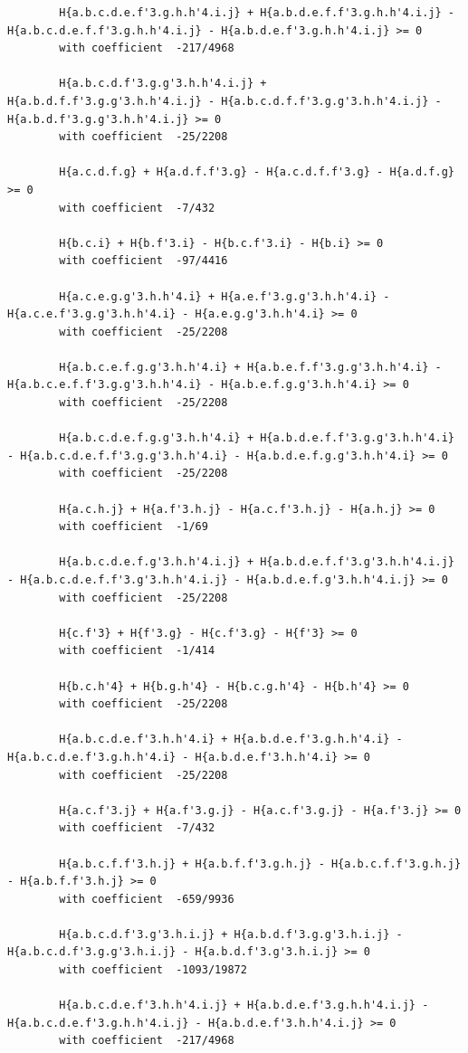 \documentclass[11pt, a4paper]{kybernetika}
\begin{document}
\begin{verbatim}
		H{a.b.c.d.e.f'3.g.h.h'4.i.j} + H{a.b.d.e.f.f'3.g.h.h'4.i.j} - H{a.b.c.d.e.f.f'3.g.h.h'4.i.j} - H{a.b.d.e.f'3.g.h.h'4.i.j} >= 0
		with coefficient  -217/4968
		
		H{a.b.c.d.f'3.g.g'3.h.h'4.i.j} + H{a.b.d.f.f'3.g.g'3.h.h'4.i.j} - H{a.b.c.d.f.f'3.g.g'3.h.h'4.i.j} - H{a.b.d.f'3.g.g'3.h.h'4.i.j} >= 0
		with coefficient  -25/2208
		
		H{a.c.d.f.g} + H{a.d.f.f'3.g} - H{a.c.d.f.f'3.g} - H{a.d.f.g} >= 0
		with coefficient  -7/432
		
		H{b.c.i} + H{b.f'3.i} - H{b.c.f'3.i} - H{b.i} >= 0
		with coefficient  -97/4416
		
		H{a.c.e.g.g'3.h.h'4.i} + H{a.e.f'3.g.g'3.h.h'4.i} - H{a.c.e.f'3.g.g'3.h.h'4.i} - H{a.e.g.g'3.h.h'4.i} >= 0
		with coefficient  -25/2208
		
		H{a.b.c.e.f.g.g'3.h.h'4.i} + H{a.b.e.f.f'3.g.g'3.h.h'4.i} - H{a.b.c.e.f.f'3.g.g'3.h.h'4.i} - H{a.b.e.f.g.g'3.h.h'4.i} >= 0
		with coefficient  -25/2208
		
		H{a.b.c.d.e.f.g.g'3.h.h'4.i} + H{a.b.d.e.f.f'3.g.g'3.h.h'4.i} - H{a.b.c.d.e.f.f'3.g.g'3.h.h'4.i} - H{a.b.d.e.f.g.g'3.h.h'4.i} >= 0
		with coefficient  -25/2208
		
		H{a.c.h.j} + H{a.f'3.h.j} - H{a.c.f'3.h.j} - H{a.h.j} >= 0
		with coefficient  -1/69
		
		H{a.b.c.d.e.f.g'3.h.h'4.i.j} + H{a.b.d.e.f.f'3.g'3.h.h'4.i.j} - H{a.b.c.d.e.f.f'3.g'3.h.h'4.i.j} - H{a.b.d.e.f.g'3.h.h'4.i.j} >= 0
		with coefficient  -25/2208
		
		H{c.f'3} + H{f'3.g} - H{c.f'3.g} - H{f'3} >= 0
		with coefficient  -1/414
		
		H{b.c.h'4} + H{b.g.h'4} - H{b.c.g.h'4} - H{b.h'4} >= 0
		with coefficient  -25/2208
		
		H{a.b.c.d.e.f'3.h.h'4.i} + H{a.b.d.e.f'3.g.h.h'4.i} - H{a.b.c.d.e.f'3.g.h.h'4.i} - H{a.b.d.e.f'3.h.h'4.i} >= 0
		with coefficient  -25/2208
		
		H{a.c.f'3.j} + H{a.f'3.g.j} - H{a.c.f'3.g.j} - H{a.f'3.j} >= 0
		with coefficient  -7/432
		
		H{a.b.c.f.f'3.h.j} + H{a.b.f.f'3.g.h.j} - H{a.b.c.f.f'3.g.h.j} - H{a.b.f.f'3.h.j} >= 0
		with coefficient  -659/9936
		
		H{a.b.c.d.f'3.g'3.h.i.j} + H{a.b.d.f'3.g.g'3.h.i.j} - H{a.b.c.d.f'3.g.g'3.h.i.j} - H{a.b.d.f'3.g'3.h.i.j} >= 0
		with coefficient  -1093/19872
		
		H{a.b.c.d.e.f'3.h.h'4.i.j} + H{a.b.d.e.f'3.g.h.h'4.i.j} - H{a.b.c.d.e.f'3.g.h.h'4.i.j} - H{a.b.d.e.f'3.h.h'4.i.j} >= 0
		with coefficient  -217/4968
		

\end{verbatim}
\end{document}
